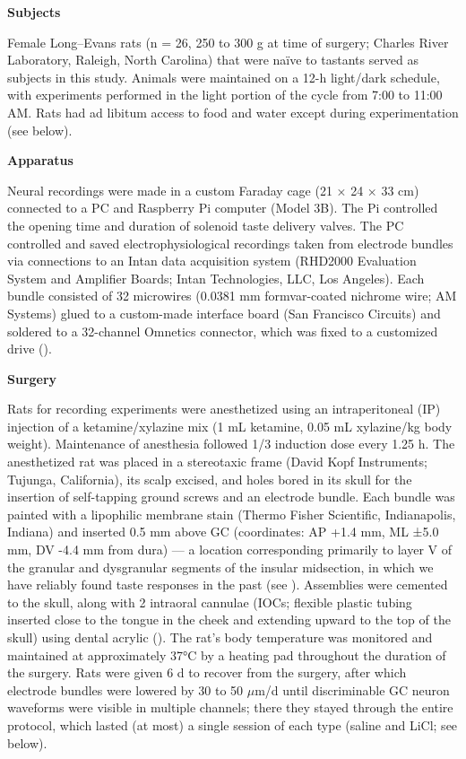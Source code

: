 \begin{refsection}
\smallskip
\noindent\textbf{Subjects}\par
\noindent 
Female Long–Evans rats (n = 26, 250 to 300 g at time of surgery; Charles River Laboratory, Raleigh, North Carolina) that were naïve to tastants served as subjects in this study. Animals were maintained on a 12-h light/dark schedule, with experiments performed in the light portion of the cycle from 7:00 to 11:00 AM. Rats had ad libitum access to food and water except during experimentation (see below).

\smallskip
\noindent\textbf{Apparatus}\par
\noindent 
Neural recordings were made in a custom Faraday cage (21 × 24 × 33 cm) connected to a PC and Raspberry Pi computer (Model 3B). The Pi controlled the opening time and duration of solenoid taste delivery valves. The PC controlled and saved electrophysiological recordings taken from electrode bundles via connections to an Intan data acquisition system (RHD2000 Evaluation System and Amplifier Boards; Intan Technologies, LLC, Los Angeles). Each bundle consisted of 32 microwires (0.0381 mm formvar-coated nichrome wire; AM Systems) glued to a custom-made interface board (San Francisco Circuits) and soldered to a 32-channel Omnetics connector, which was fixed to a customized drive (\cite{mukherjee2017a}).

\smallskip
\noindent\textbf{Surgery}\par
\noindent 
Rats for recording experiments were anesthetized using an intraperitoneal (IP) injection of a ketamine/xylazine mix (1 mL ketamine, 0.05 mL xylazine/kg body weight). Maintenance of anesthesia followed 1/3 induction dose every 1.25 h. The anesthetized rat was placed in a stereotaxic frame (David Kopf Instruments; Tujunga, California), its scalp excised, and holes bored in its skull for the insertion of self-tapping ground screws and an electrode bundle. Each bundle was painted with a lipophilic membrane stain (Thermo Fisher Scientific, Indianapolis, Indiana) and inserted 0.5 mm above GC (coordinates: AP +1.4 mm, ML ±5.0 mm, DV -4.4 mm from dura) --- a location corresponding primarily to layer V of the granular and dysgranular segments of the insular midsection, in which we have reliably found taste responses in the past (see \cite{katz-a,katz2001a,sadacca2016a}). Assemblies were cemented to the skull, along with 2 intraoral cannulae (IOCs; flexible plastic tubing inserted close to the tongue in the cheek and extending upward to the top of the skull) using dental acrylic (\cite{fontanini2006a}). The rat’s body temperature was monitored and maintained at approximately 37°C by a heating pad throughout the duration of the surgery. Rats were given 6 d to recover from the surgery, after which electrode bundles were lowered by 30 to 50 \(\mu\)m/d until discriminable GC neuron waveforms were visible in multiple channels; there they stayed through the entire protocol, which lasted (at most) a single session of each type (saline and LiCl; see below).


\end{refsection}
